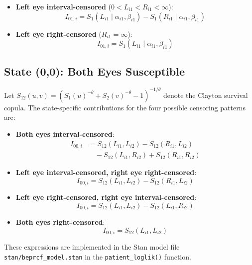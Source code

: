 \documentclass[12pt,a4paper]{article}
\begin{document}
\begin{itemize}
\item \textbf{Left eye interval-censored} ($0 < L_{i1} < R_{i1} < \infty$):
  \begin{equation}
  I_{01,i} = S_1(L_{i1} \mid \alpha_{i1}, \beta_{i1}) - S_1(R_{i1} \mid \alpha_{i1}, \beta_{i1})
  \end{equation}
\item \textbf{Left eye right-censored} ($R_{i1} = \infty$):
  \begin{equation}
  I_{01,i} = S_1(L_{i1} \mid \alpha_{i1}, \beta_{i1})
  \end{equation}
\end{itemize}

\subsection{State (0,0): Both Eyes Susceptible}

Let $S_{12}(u,v) = \left(S_1(u)^{-\theta} + S_2(v)^{-\theta} - 1\right)^{-1/\theta}$ denote the Clayton survival copula. The state-specific contributions for the four possible censoring patterns are:

\begin{itemize}
\item \textbf{Both eyes interval-censored}:
  \begin{align}
  I_{00,i} &= S_{12}(L_{i1}, L_{i2}) - S_{12}(R_{i1}, L_{i2}) \nonumber \\
           &\quad - S_{12}(L_{i1}, R_{i2}) + S_{12}(R_{i1}, R_{i2})
  \end{align}
\item \textbf{Left eye interval-censored, right eye right-censored}:
  \begin{equation}
  I_{00,i} = S_{12}(L_{i1}, L_{i2}) - S_{12}(R_{i1}, L_{i2})
  \end{equation}
\item \textbf{Left eye right-censored, right eye interval-censored}:
  \begin{equation}
  I_{00,i} = S_{12}(L_{i1}, L_{i2}) - S_{12}(L_{i1}, R_{i2})
  \end{equation}
\item \textbf{Both eyes right-censored}:
  \begin{equation}
  I_{00,i} = S_{12}(L_{i1}, L_{i2})
  \end{equation}
\end{itemize}

These expressions are implemented in the Stan model file \texttt{stan/beprcf\_model.stan} in the \texttt{patient\_loglik()} function.
\end{document}
